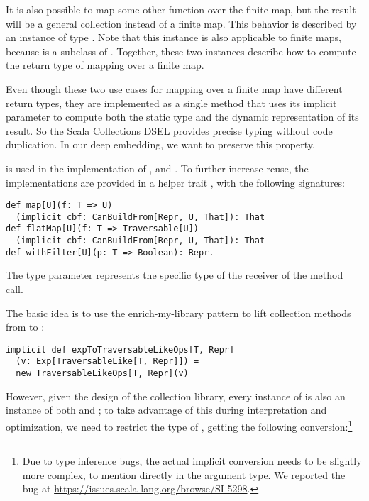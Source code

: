 It is also possible to map some other function over the finite map, but the result will be a general collection instead of a finite map. This behavior is described by an instance of type \code{CanBuildFrom[Traversable[T], U, Traversable[U]}. Note that this instance is also applicable to finite maps, because  is a subclass of . Together, these two instances describe how to compute the return type of mapping over a finite map.

Even though these two use cases for mapping over a finite map have different return types, they are implemented as a single method that uses its implicit  parameter to compute both the static type and the dynamic representation of its result. So the Scala Collections DSEL provides precise typing without code duplication. In our deep embedding, we want to preserve this property.

 is used in the implementation of ,  and . To further increase reuse, the implementations are provided in a helper trait , with the following signatures:

\begin{lstlisting}
def map[U](f: T => U)
  (implicit cbf: CanBuildFrom[Repr, U, That]): That
def flatMap[U](f: T => Traversable[U])
  (implicit cbf: CanBuildFrom[Repr, U, That]): That
def withFilter[U](p: T => Boolean): Repr.
\end{lstlisting}

The  type parameter represents the specific type of the receiver of the method call.

The basic idea is to use the enrich-my-library pattern to lift collection methods from  to :
\begin{lstlisting}
implicit def expToTraversableLikeOps[T, Repr]
  (v: Exp[TraversableLike[T, Repr]]) =
  new TraversableLikeOps[T, Repr](v)
\end{lstlisting}

However, given the design of the collection library, every instance of  is also an instance of both  and ; to take advantage of this during interpretation and optimization, we need to restrict the type of , getting the following conversion:\footnote{Due to type inference bugs, the actual implicit conversion needs to be slightly more complex, to mention  directly in the argument type. We reported the bug at \url{https://issues.scala-lang.org/browse/SI-5298}.}

